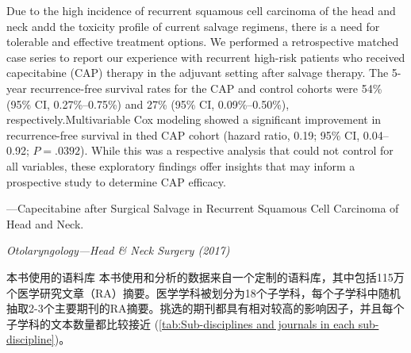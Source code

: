 \documentclass[a4paper]{ctexbook}
\begin{document}
\begin{sample}[label={myautocounter}]{\heiti}
  Due to the high incidence of recurrent squamous cell carcinoma of the head and neck andd the toxicity profile of current salvage regimens, there is a need for tolerable and effective treatment options. We performed a retrospective matched case series to report our experience with recurrent high-risk patients who received capecitabine (CAP) therapy in the adjuvant setting after salvage therapy. The 5-year recurrence-free survival rates for the CAP and control cohorts were 54\% (95\% CI, 0.27\%--0.75\%) and 27\% (95\% CI, 0.09\%--0.50\%), respectively.Multivariable Cox modeling showed a significant improvement in recurrence-free survival in thed CAP cohort (hazard ratio, 0.19; 95\% CI, 0.04--0.92; $P=.0 392$). While this was a respective analysis that could not control for all variables, these exploratory findings offer insights that may inform a prospective study to determine CAP efficacy.
  
  \begin{flushright}
    ---Capecitabine after Surgical Salvage in Recurrent Squamous Cell Carcinoma of Head and Neck. 
    
    \emph{Otolaryngology---Head \& Neck Surgery (2017)}
  \end{flushright}


\end{sample}

\begin{note}[label={myautocounter}]{\heiti 本书使用的语料库}
  本书使用和分析的数据来自一个定制的语料库，其中包括115万个医学研究文章（RA）摘要。医学学科被划分为18个子学科，每个子学科中随机抽取2-3个主要期刊的RA摘要。挑选的期刊都具有相对较高的影响因子，并且每个子学科的文本数量都比较接近 (\autoref{tab:Sub-disciplines and journals in each sub-discipline})。

\end{note}
\end{document}

